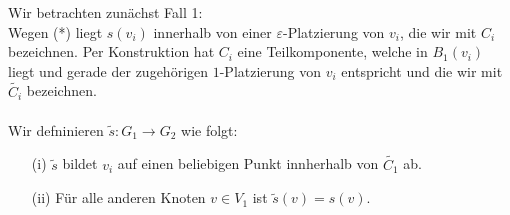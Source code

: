 \documentclass[a4paper, 12pt, twoside]{article}
\theoremstyle{Format1} %
\begin{document}
Wir betrachten zunächst Fall 1:
\\
Wegen (*) liegt $s(v_i)$ innerhalb von  einer $\varepsilon$-Platzierung von $v_i$, die wir mit $C_i$ bezeichnen.
Per Konstruktion hat $C_i$ eine Teilkomponente, welche in $B_1(v_i)$ liegt und gerade der zugehörigen $1$-Platzierung von $v_i$ entspricht und die wir mit $\tilde{C_i}$ bezeichnen.
\\
\\
Wir defninieren $\tilde{s}: G_1 \rightarrow G_2$ wie folgt:
\begin{enumerate}
	\item[(i)] $\tilde{s}$ bildet $v_i$ auf einen beliebigen Punkt innherhalb von $\tilde{C_1}$ ab.
	\item[(ii)] Für alle anderen Knoten $v \in V_1$ ist $\tilde{s}(v)=s(v)$.
\end{enumerate}
\end{document}
